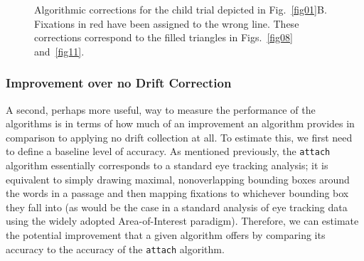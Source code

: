 \documentclass[doc,biblatex]{apa7}
\begin{document}
	\begin{figure}
	\vspace*{2pt}
	\caption{Algorithmic corrections for the child trial depicted in Fig.~\ref{fig01}B. Fixations in red have been assigned to the wrong line. These corrections correspond to the filled triangles in Figs.~\ref{fig08} and~\ref{fig11}.}
	\label{fig10}
	\end{figure}

\subsubsection{Improvement over no Drift Correction}

A second, perhaps more useful, way to measure the performance of the algorithms is in terms of how much of an improvement an algorithm provides in comparison to applying no drift collection at all. To estimate this, we first need to define a baseline level of accuracy. As mentioned previously, the \texttt{attach} algorithm essentially corresponds to a standard eye tracking analysis; it is equivalent to simply drawing maximal, nonoverlapping bounding boxes around the words in a passage and then mapping fixations to whichever bounding box they fall into (as would be the case in a standard analysis of eye tracking data using the widely adopted Area-of-Interest paradigm). Therefore, we can estimate the potential improvement that a given algorithm offers by comparing its accuracy to the accuracy of the \texttt{attach} algorithm.
\end{document}
